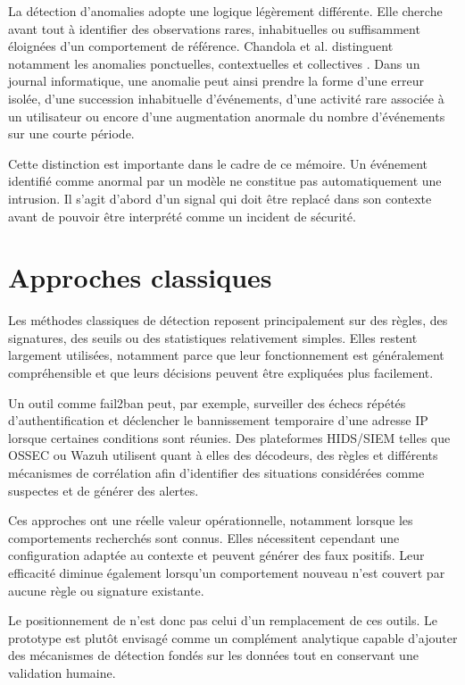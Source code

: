 La détection d'anomalies adopte une logique légèrement différente. Elle cherche avant tout à identifier des observations rares, inhabituelles ou suffisamment éloignées d'un comportement de référence. Chandola et al. distinguent notamment les anomalies ponctuelles, contextuelles et collectives \cite{chandola2009anomaly}. Dans un journal informatique, une anomalie peut ainsi prendre la forme d'une erreur isolée, d'une succession inhabituelle d'événements, d'une activité rare associée à un utilisateur ou encore d'une augmentation anormale du nombre d'événements sur une courte période.

Cette distinction est importante dans le cadre de ce mémoire. Un événement identifié comme anormal par un modèle ne constitue pas automatiquement une intrusion. Il s'agit d'abord d'un signal qui doit être replacé dans son contexte avant de pouvoir être interprété comme un incident de sécurité.

\section{Approches classiques}

Les méthodes classiques de détection reposent principalement sur des règles, des signatures, des seuils ou des statistiques relativement simples. Elles restent largement utilisées, notamment parce que leur fonctionnement est généralement compréhensible et que leurs décisions peuvent être expliquées plus facilement.

Un outil comme fail2ban peut, par exemple, surveiller des échecs répétés d'authentification et déclencher le bannissement temporaire d'une adresse IP lorsque certaines conditions sont réunies. Des plateformes HIDS/SIEM telles que OSSEC ou Wazuh utilisent quant à elles des décodeurs, des règles et différents mécanismes de corrélation afin d'identifier des situations considérées comme suspectes et de générer des alertes.

Ces approches ont une réelle valeur opérationnelle, notamment lorsque les comportements recherchés sont connus. Elles nécessitent cependant une configuration adaptée au contexte et peuvent générer des faux positifs. Leur efficacité diminue également lorsqu'un comportement nouveau n'est couvert par aucune règle ou signature existante.

Le positionnement de \logminer{} n'est donc pas celui d'un remplacement de ces outils. Le prototype est plutôt envisagé comme un complément analytique capable d'ajouter des mécanismes de détection fondés sur les données tout en conservant une validation humaine.

